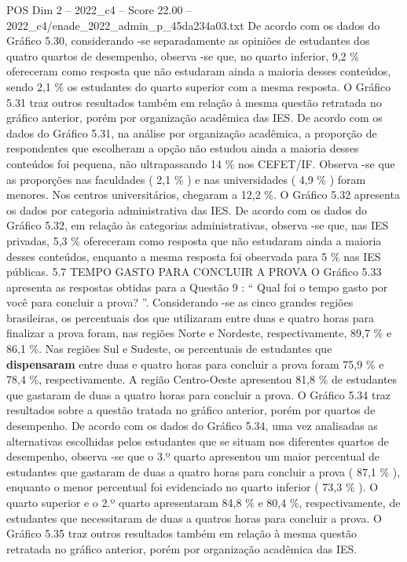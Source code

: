 \begin{textsample}{POS Dim 2 – 2022\_c4 – Score 22.00 – 2022\_c4/enade\_2022\_admin\_p\_45da234a03.txt}
De acordo com os dados do Gráfico 5.30, considerando -se separadamente as opiniões de estudantes dos quatro quartos de desempenho, observa -se que, no quarto inferior, 9,2 \% ofereceram como resposta que não estudaram ainda a maioria desses conteúdos, sendo 2,1 \% os estudantes do quarto superior com a mesma resposta.
O Gráfico 5.31 traz outros resultados também em relação à mesma questão retratada no gráfico anterior, porém por organização acadêmica das IES.
De acordo com os dados do Gráfico 5.31, na análise por organização acadêmica, a proporção de respondentes que escolheram a opção não estudou ainda a maioria desses conteúdos foi pequena, não ultrapassando 14 \% nos CEFET/IF.
Observa -se que as proporções nas faculdades ( 2,1 \% ) e nas universidades ( 4,9 \% ) foram menores.
Nos centros universitários, chegaram a 12,2 \%.
O Gráfico 5.32 apresenta os dados por categoria administrativa das IES.
De acordo com os dados do Gráfico 5.32, em relação às categorias administrativas, observa -se que, nas IES privadas, 5,3 \% ofereceram como resposta que não estudaram ainda a maioria desses conteúdos, enquanto a mesma resposta foi observada para 5 \% nas IES públicas. 5.7 TEMPO GASTO PARA CONCLUIR A PROVA O Gráfico 5.33 apresenta as respostas obtidas para a Questão 9 : “ Qual foi o tempo gasto por você para concluir a prova? ”.
Considerando -se as cinco grandes regiões brasileiras, os percentuais dos que utilizaram entre duas e quatro horas para finalizar a prova foram, nas regiões Norte e Nordeste, respectivamente, 89,7 \% e 86,1 \%.
Nas regiões Sul e Sudeste, os percentuais de estudantes que \textbf{dispensaram} entre duas e quatro horas para concluir a prova foram 75,9 \% e 78,4 \%, respectivamente.
A região Centro-Oeste apresentou 81,8 \% de estudantes que gastaram de duas a quatro horas para concluir a prova.
O Gráfico 5.34 traz resultados sobre a questão tratada no gráfico anterior, porém por quartos de desempenho.
De acordo com os dados do Gráfico 5.34, uma vez analisadas as alternativas escolhidas pelos estudantes que se situam nos diferentes quartos de desempenho, observa -se que o 3.º quarto apresentou um maior percentual de estudantes que gastaram de duas a quatro horas para concluir a prova ( 87,1 \% ), enquanto o menor percentual foi evidenciado no quarto inferior ( 73,3 \% ).
O quarto superior e o 2.º quarto apresentaram 84,8 \% e 80,4 \%, respectivamente, de estudantes que necessitaram de duas a quatros horas para concluir a prova.
O Gráfico 5.35 traz outros resultados também em relação à mesma questão retratada no gráfico anterior, porém por organização acadêmica das IES.

\end{textsample}
